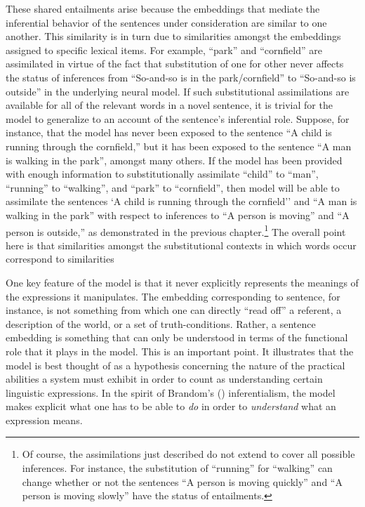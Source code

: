 These shared entailments arise because the embeddings that mediate the inferential behavior of the sentences under consideration are similar to one another. This similarity is in turn due to similarities amongst the embeddings assigned to specific lexical items. For example, ``park'' and ``cornfield'' are assimilated in virtue of the fact that substitution of one for other never affects the status of inferences from ``So-and-so is in the park/cornfield'' to ``So-and-so is outside'' in the underlying neural model. If such substitutional assimilations are available for all of the relevant words in a novel sentence, it is trivial for the model to generalize to an account of the sentence's inferential role. Suppose, for instance, that the model has never been exposed to the sentence ``A child is running through the cornfield,'' but it has been exposed to the sentence ``A man is walking in the park'', amongst many others. If the model has been provided with enough information to substitutionally assimilate ``child'' to ``man'', ``running'' to ``walking'', and ``park'' to ``cornfield'', then model will be able to assimilate the sentences `A child is running through the cornfield'' and ``A man is walking in the park'' with respect to inferences to ``A person is moving'' and ``A person is outside,'' as demonstrated in the previous chapter.\footnote{Of course, the assimilations just described do not extend to cover all possible inferences. For instance, the substitution of ``running'' for ``walking'' can change whether or not the sentences ``A person is moving quickly'' and ``A person is moving slowly'' have the status of entailments.} The overall point here is that similarities amongst the substitutional contexts in which words occur correspond to similarities 


One key feature of the model is that it never explicitly represents the meanings of the expressions it manipulates. The embedding corresponding to sentence, for instance, is not something from which one can directly ``read off'' a referent, a description of the world, or a set of truth-conditions. Rather, a sentence embedding is something that can only be understood in terms of the functional role that it plays in the model. This is an important point. It illustrates that the model is best thought of as a hypothesis concerning the nature of the practical abilities a system must exhibit in order to count as understanding certain linguistic expressions. In the spirit of Brandom's (\citeyear{Brandom:1994}) inferentialism, the model makes explicit what one has to be able to \textit{do} in order to \textit{understand} what an expression means.


